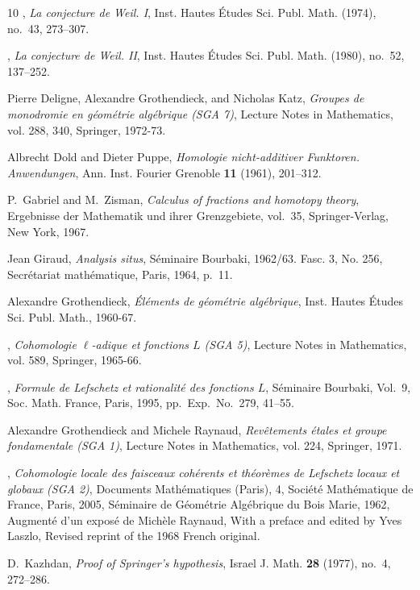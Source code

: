 \documentclass[12pt,oneside,english]{smfbook}
\begin{document}
\begin{thebibliography}{10}
 \bysame, \emph{La conjecture de {W}eil. {I}}, Inst. Hautes \'Etudes Sci. Publ. Math. (1974), no.~43, 273--307.

 \bysame, \emph{La conjecture de {W}eil. {II}}, Inst. Hautes \'Etudes Sci. Publ. Math. (1980), no.~52, 137--252.

 Pierre Deligne, Alexandre Grothendieck, and Nicholas Katz, \emph{Groupes de monodromie en g\'eom\'etrie alg\'ebrique ({SGA 7})}, Lecture Notes in Mathematics, vol. 288, 340, Springer, 1972-73.

 Albrecht Dold and Dieter Puppe, \emph{Homologie nicht-additiver {F}unktoren. {A}nwendungen}, Ann. Inst. Fourier Grenoble \textbf{11} (1961), 201--312. 

 P.~Gabriel and M.~Zisman, \emph{Calculus of fractions and homotopy theory}, Ergebnisse der Mathematik und ihrer Grenzgebiete, vol.~35, Springer-Verlag, New York, 1967.

 Jean Giraud, \emph{Analysis situs}, S\'eminaire {B}ourbaki, 1962/63. {F}asc. 3, {N}o. 256, Secr\'etariat math\'ematique, Paris, 1964, p.~11. 

 Alexandre Grothendieck, \emph{\'{E}l\'ements de g\'eom\'etrie alg\'ebrique}, Inst. Hautes \'Etudes Sci. Publ. Math., 1960-67.

 \bysame, \emph{Cohomologie {$\ell$}-adique et fonctions {$L$} ({SGA 5})}, Lecture Notes in Mathematics, vol. 589, Springer, 1965-66.

 \bysame, \emph{Formule de {L}efschetz et rationalit\'e des fonctions {$L$}}, S\'eminaire {B}ourbaki, {V}ol.\ 9, Soc. Math. France, Paris, 1995, pp.~Exp.\ No.\ 279, 41--55. 

 Alexandre Grothendieck and Michele Raynaud, \emph{Rev\^etements \'etales et groupe fondamentale ({SGA 1})}, Lecture Notes in Mathematics, vol. 224, Springer, 1971.

 \bysame, \emph{Cohomologie locale des faisceaux coh\'erents et th\'eor\`emes de {L}efschetz locaux et globaux ({SGA 2})}, Documents Math\'ematiques (Paris), 4, Soci\'et\'e Math\'ematique de France, Paris, 2005, S{\'e}minaire de G{\'e}om{\'e}trie Alg{\'e}brique du Bois Marie, 1962, Augment{\'e} d'un expos{\'e} de Mich{\`e}le Raynaud, With a preface and edited by Yves Laszlo, Revised reprint of the 1968 French original.

 D.~Kazhdan, \emph{Proof of {S}pringer's hypothesis}, Israel J. Math. \textbf{28} (1977), no.~4, 272--286.


\end{thebibliography}
\end{document}
